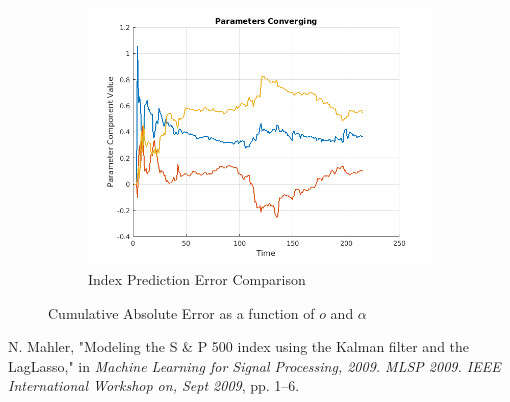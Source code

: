 \documentclass[11pt, fleqn]{article}
\begin{document}
\begin{figure}[!h]
    ~ 
    \begin{subfigure}[b]{0.3\textwidth}
        \includegraphics[width=\textwidth]{kalman-parameter-converge.png}
		\caption{Index Prediction Error Comparison}
		\label{fig:kalman-parameter-converge}
    \end{subfigure}
    \caption{Cumulative Absolute Error as a function of $o$ and $\alpha$}
	\label{fig:o-alpha-error}
\end{figure}

\begin{figure}[!h]
  	\centering
  	
\end{figure}

\begin{thebibliography}{9}
N. Mahler, "Modeling the S \& P 500 index using the Kalman filter and the LagLasso," in \textit{Machine Learning for Signal Processing, 2009. MLSP 2009. IEEE International Workshop on, Sept 2009}, pp. 1–6.

\end{thebibliography}
\end{document}
